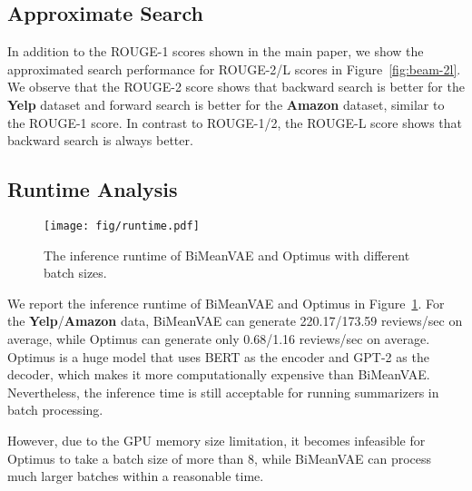 \documentclass[11pt]{article}
\newcommand{\name}{\mbox{\sc BiMeanVAE}}
\newcommand{\yelp}{\mbox{\bf Yelp}}
\newcommand{\amazon}{\mbox{\bf Amazon}}
\begin{document}
\subsection{Approximate Search}
\label{app:beam-2l}
In addition to the ROUGE-1 scores shown in the main paper, we show the approximated search performance for ROUGE-2/L scores in Figure~\ref{fig:beam-2l}.
We observe that the ROUGE-2 score shows that backward search is better for the \yelp{} dataset and forward search is better for the \amazon{} dataset, similar to the ROUGE-1 score.
In contrast to ROUGE-1/2, the ROUGE-L score shows that backward search is always better.

\subsection{Runtime Analysis}
\label{app:runtime}
\begin{figure}[t]
    \centering
    \texttt{[image: fig/runtime.pdf]}
    \caption{The inference runtime of \name{} and Optimus with different batch sizes.}
    \label{fig:runtime}
\end{figure}
We report the inference runtime of \name{} and Optimus in Figure~\ref{fig:runtime}.
For the \yelp{}/\amazon{} data, \name{} can generate 220.17/173.59 reviews/sec on average, while Optimus can generate only 0.68/1.16 reviews/sec on average.
Optimus is a huge model that uses BERT as the encoder and GPT-2 as the decoder, which makes it more computationally expensive than \name.
Nevertheless, the inference time is still acceptable for running summarizers in batch processing. 

However, due to the GPU memory size limitation, it becomes infeasible for Optimus to take a batch size of more than 8, while \name{} can process much larger batches within a reasonable time. 

        

        
\end{document}
